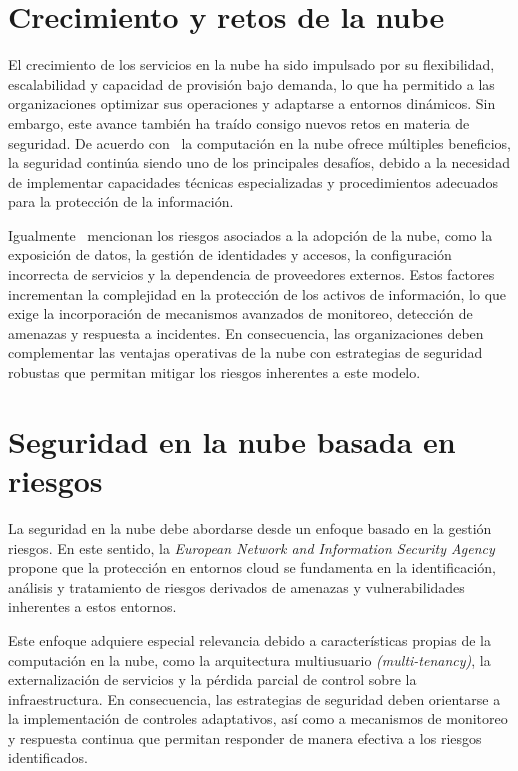 \section{Crecimiento y retos de la nube}
\noindent
El crecimiento de los servicios en la nube ha sido impulsado por su flexibilidad, escalabilidad y capacidad de provisión bajo demanda, 
lo que ha permitido a las organizaciones optimizar sus operaciones y adaptarse a entornos dinámicos. Sin embargo, este avance también 
ha traído consigo nuevos retos en materia de seguridad. De acuerdo con~\cite{ibm2025cloud} la computación en la nube ofrece múltiples 
beneficios, la seguridad continúa siendo uno de los principales desafíos, debido a la necesidad de implementar capacidades técnicas 
especializadas y procedimientos adecuados para la protección de la información.

Igualmente~\cite{ibm2025cloud} mencionan los riesgos asociados a la adopción de la nube, como la exposición de datos, la gestión de 
identidades y accesos, la configuración incorrecta de servicios y la dependencia de proveedores externos. Estos factores incrementan 
la complejidad en la protección de los activos de información, lo que exige la incorporación de mecanismos avanzados de monitoreo, 
detección de amenazas y respuesta a incidentes. En consecuencia, las organizaciones deben complementar las ventajas operativas de la 
nube con estrategias de seguridad robustas que permitan mitigar los riesgos inherentes a este modelo.

\section{Seguridad en la nube basada en riesgos}
\noindent
La seguridad en la nube debe abordarse desde un enfoque basado en la gestión riesgos. En este sentido, la \textit{European Network and Information Security Agency}
propone que la protección en entornos cloud se fundamenta en la identificación, análisis y tratamiento de riesgos derivados de amenazas y 
vulnerabilidades inherentes a estos entornos.

Este enfoque adquiere especial relevancia debido a características propias de la computación en la nube, como la arquitectura multiusuario \textit{(multi-tenancy)}, 
la externalización de servicios y la pérdida parcial de control sobre la infraestructura. En consecuencia, las estrategias de seguridad deben orientarse a la implementación 
de controles adaptativos, así como a mecanismos de monitoreo y respuesta continua que permitan responder de manera efectiva a los riesgos identificados.

